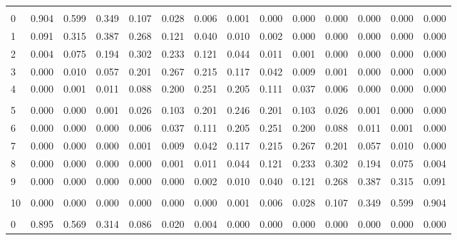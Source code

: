 \documentclass[
]{article}
\begin{document}
\begin{table}[H]
\begin{tabular}{lrrrrrrrrrrrrr}
\addlinespace[0.3em]
\multicolumn{14}{l}{$n=10$}\\
\hspace{1em}0 & 0.904 & 0.599 & 0.349 & 0.107 & 0.028 & 0.006 & 0.001 & 0.000 & 0.000 & 0.000 & 0.000 & 0.000 & 0.000\\
\hspace{1em}1 & 0.091 & 0.315 & 0.387 & 0.268 & 0.121 & 0.040 & 0.010 & 0.002 & 0.000 & 0.000 & 0.000 & 0.000 & 0.000\\
\hspace{1em}2 & 0.004 & 0.075 & 0.194 & 0.302 & 0.233 & 0.121 & 0.044 & 0.011 & 0.001 & 0.000 & 0.000 & 0.000 & 0.000\\
\hspace{1em}3 & 0.000 & 0.010 & 0.057 & 0.201 & 0.267 & 0.215 & 0.117 & 0.042 & 0.009 & 0.001 & 0.000 & 0.000 & 0.000\\
\hspace{1em}4 & 0.000 & 0.001 & 0.011 & 0.088 & 0.200 & 0.251 & 0.205 & 0.111 & 0.037 & 0.006 & 0.000 & 0.000 & 0.000\\
\addlinespace[-.7em]
\multicolumn{14}{l}{ }\\
\hspace{1em}5 & 0.000 & 0.000 & 0.001 & 0.026 & 0.103 & 0.201 & 0.246 & 0.201 & 0.103 & 0.026 & 0.001 & 0.000 & 0.000\\
\hspace{1em}6 & 0.000 & 0.000 & 0.000 & 0.006 & 0.037 & 0.111 & 0.205 & 0.251 & 0.200 & 0.088 & 0.011 & 0.001 & 0.000\\
\hspace{1em}7 & 0.000 & 0.000 & 0.000 & 0.001 & 0.009 & 0.042 & 0.117 & 0.215 & 0.267 & 0.201 & 0.057 & 0.010 & 0.000\\
\hspace{1em}8 & 0.000 & 0.000 & 0.000 & 0.000 & 0.001 & 0.011 & 0.044 & 0.121 & 0.233 & 0.302 & 0.194 & 0.075 & 0.004\\
\hspace{1em}9 & 0.000 & 0.000 & 0.000 & 0.000 & 0.000 & 0.002 & 0.010 & 0.040 & 0.121 & 0.268 & 0.387 & 0.315 & 0.091\\
\addlinespace[-.7em]
\multicolumn{14}{l}{ }\\
\hspace{1em}10 & 0.000 & 0.000 & 0.000 & 0.000 & 0.000 & 0.000 & 0.001 & 0.006 & 0.028 & 0.107 & 0.349 & 0.599 & 0.904\\
\addlinespace[0.3em]
\multicolumn{14}{l}{$n=11$}\\
\hspace{1em}0 & 0.895 & 0.569 & 0.314 & 0.086 & 0.020 & 0.004 & 0.000 & 0.000 & 0.000 & 0.000 & 0.000 & 0.000 & 0.000\\

\end{tabular}
\end{table}
\end{document}

